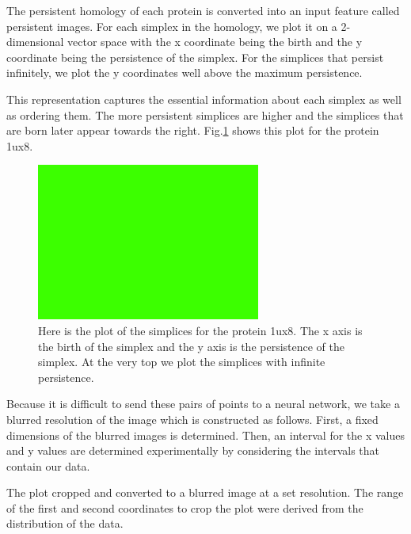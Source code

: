 \documentclass[12pt, a4paper, twocolumn, fullpage]{article}
\theoremstyle{plain}
\theoremstyle{definition}
\theoremstyle{remark}
\begin{document}
The persistent homology of each protein is converted into an input feature called persistent images. For each simplex in the homology, we plot it on a 2-dimensional vector space with the x coordinate being the birth and the y coordinate being the persistence of the simplex. For the simplices that persist infinitely, we plot the y coordinates well above the maximum persistence.

This representation captures the essential information about each simplex as well as ordering them. The more persistent simplices are higher and the simplices that are born later appear towards the right.  Fig.\ref{persistencePlot} shows this plot for the protein 1ux8.

\begin{figure}
    \includegraphics[width=\linewidth]{img/blank.png}
    \caption{Here is the plot of the simplices for the protein 1ux8. The x axis is the birth of the simplex and the y axis is the persistence of the simplex. At the very top we plot the simplices with infinite persistence.}
    \label{persistencePlot}
\end{figure}

Because it is difficult to send these pairs of points to a neural network, we take a blurred resolution of the image which is constructed as follows. First, a fixed dimensions of the blurred images is determined. Then, an interval for the x values and y values are determined experimentally by considering the intervals that contain our data. 

The plot cropped and converted to a blurred image at a set resolution. The range of the first and second coordinates to crop the plot were derived from the distribution of the data.
\end{document}
